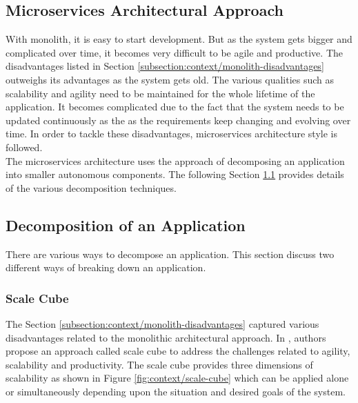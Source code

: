 \begin{enumerate}
\section{Microservices Architectural Approach}\label{section:context/microservices_architecture_style}
With monolith, it is easy to start development. But as the system gets bigger and complicated over time, it becomes very difficult to be agile and productive. The disadvantages listed in Section \ref{subsection:context/monolith-disadvantages} outweighs its advantages as the system gets old. The various qualities such as scalability and agility need to be maintained for the whole lifetime of the application. It becomes complicated due to the fact that the system needs to be updated continuously as the as the requirements keep changing and evolving over time. In order to tackle these disadvantages, microservices architecture style is followed.\\
The microservices architecture uses the approach of decomposing an application into smaller autonomous components. The following Section \ref{section:context/microservices_architecture_style/decompostion_of_an_application} provides details of the various decomposition techniques.

\subsection{Decomposition of an Application}\label{section:context/microservices_architecture_style/decompostion_of_an_application}
There are various ways to decompose an application. This section discuss two different ways of breaking down an application.

\subsubsection{Scale Cube}\label{section:context/microservices_architecture_style/decompostion_of_an_application/scale_cube}
The Section \ref{subsection:context/monolith-disadvantages} captured various disadvantages related to the monolithic architectural approach. In \cite{Fisher:2015aa}, authors propose an approach called scale cube to address the challenges related to agility, scalability and productivity. The scale cube provides three dimensions of scalability as shown in Figure \ref{fig:context/scale-cube} which can be applied alone or simultaneously depending upon the situation and desired goals of the system.


\end{enumerate}
